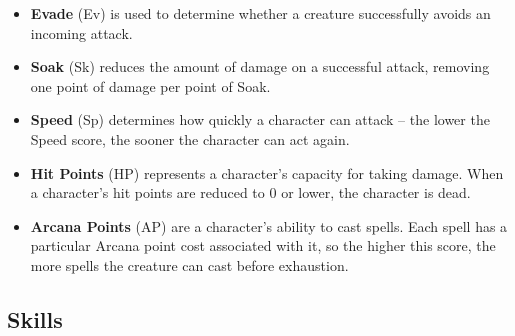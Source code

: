 \begin{itemize}
\item {\bf Evade} (Ev) is used to determine whether a creature successfully
avoids an incoming attack.

\item {\bf Soak} (Sk) reduces the amount of damage on a successful attack,
removing one point of damage per point of Soak.

\item {\bf Speed} (Sp) determines how quickly a character can attack -- the
lower the Speed score, the sooner the character can act again.

\item {\bf Hit Points} (HP) represents a character's capacity for taking 
damage.  When a character's hit points are reduced to 0 or lower, the 
character is dead.

\item {\bf Arcana Points} (AP) are a character's ability to cast spells.  
Each spell has a particular Arcana point cost associated with it, so the 
higher this score, the more spells the creature can cast before exhaustion.
\end{itemize}

\subsection{Skills}

